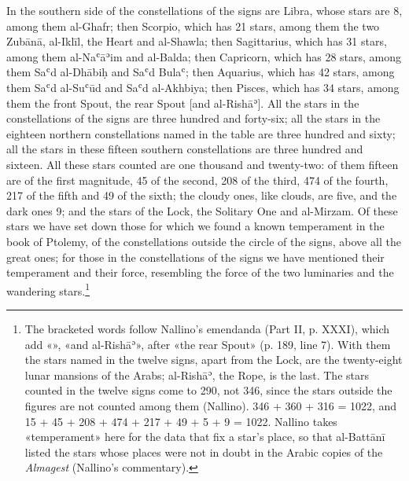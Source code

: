 \documentclass[11pt]{article}
\begin{document}
\par In the southern side of the constellations of the signs are Libra, whose stars are 8, among them al-Ghafr; then Scorpio, which has 21 stars, among them the two Zubānā, al-Iklīl, the Heart and al-Shawla; then Sagittarius, which has 31 stars, among them al-Naʿāʾim and al-Balda; then Capricorn, which has 28 stars, among them Saʿd al-Dhābiḥ and Saʿd Bulaʿ; then Aquarius, which has 42 stars, among them Saʿd al-Suʿūd and Saʿd al-Akhbiya; then Pisces, which has 34 stars, among them the front Spout, the rear Spout [and al-Rishāʾ]. All the stars in the constellations of the signs are three hundred and forty-six; all the stars in the eighteen northern constellations named in the table are three hundred and sixty; all the stars in these fifteen southern constellations are three hundred and sixteen. All these stars counted are one thousand and twenty-two: of them fifteen are of the first magnitude, 45 of the second, 208 of the third, 474 of the fourth, 217 of the fifth and 49 of the sixth; the cloudy ones, like clouds, are five, and the dark ones 9; and the stars of the Lock, the Solitary One and al-Mirzam. Of these stars we have set down those for which we found a known temperament in the book of Ptolemy, of the constellations outside the circle of the signs, above all the great ones; for those in the constellations of the signs we have mentioned their temperament and their force, resembling the force of the two luminaries and the wandering stars.\footnote{The bracketed words follow Nallino's emendanda (Part II, p. XXXI), which add «», «and al-Rishāʾ», after «the rear Spout» (p. 189, line 7). With them the stars named in the twelve signs, apart from the Lock, are the twenty-eight lunar mansions of the Arabs; al-Rishāʾ, the Rope, is the last. The stars counted in the twelve signs come to 290, not 346, since the stars outside the figures are not counted among them (Nallino). 346 + 360 + 316 = 1022, and 15 + 45 + 208 + 474 + 217 + 49 + 5 + 9 = 1022. Nallino takes «temperament» here for the data that fix a star's place, so that al-Battānī listed the stars whose places were not in doubt in the Arabic copies of the \emph{Almagest} (Nallino's commentary).}\par
\end{document}
